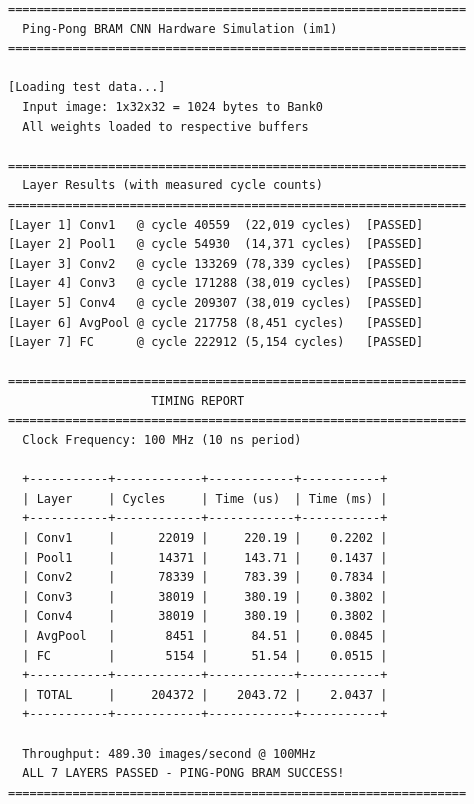 \documentclass[11pt,a4paper]{article}
\begin{document}
\begin{lstlisting}[caption=End-to-End Test Output (tb\_cnn\_pingpong)]
================================================================
  Ping-Pong BRAM CNN Hardware Simulation (im1)
================================================================

[Loading test data...]
  Input image: 1x32x32 = 1024 bytes to Bank0
  All weights loaded to respective buffers

================================================================
  Layer Results (with measured cycle counts)
================================================================
[Layer 1] Conv1   @ cycle 40559  (22,019 cycles)  [PASSED]
[Layer 2] Pool1   @ cycle 54930  (14,371 cycles)  [PASSED]
[Layer 3] Conv2   @ cycle 133269 (78,339 cycles)  [PASSED]
[Layer 4] Conv3   @ cycle 171288 (38,019 cycles)  [PASSED]
[Layer 5] Conv4   @ cycle 209307 (38,019 cycles)  [PASSED]
[Layer 6] AvgPool @ cycle 217758 (8,451 cycles)   [PASSED]
[Layer 7] FC      @ cycle 222912 (5,154 cycles)   [PASSED]

================================================================
                    TIMING REPORT
================================================================
  Clock Frequency: 100 MHz (10 ns period)

  +-----------+------------+------------+-----------+
  | Layer     | Cycles     | Time (us)  | Time (ms) |
  +-----------+------------+------------+-----------+
  | Conv1     |      22019 |     220.19 |    0.2202 |
  | Pool1     |      14371 |     143.71 |    0.1437 |
  | Conv2     |      78339 |     783.39 |    0.7834 |
  | Conv3     |      38019 |     380.19 |    0.3802 |
  | Conv4     |      38019 |     380.19 |    0.3802 |
  | AvgPool   |       8451 |      84.51 |    0.0845 |
  | FC        |       5154 |      51.54 |    0.0515 |
  +-----------+------------+------------+-----------+
  | TOTAL     |     204372 |    2043.72 |    2.0437 |
  +-----------+------------+------------+-----------+

  Throughput: 489.30 images/second @ 100MHz
  ALL 7 LAYERS PASSED - PING-PONG BRAM SUCCESS!
================================================================
\end{lstlisting}
\end{document}
